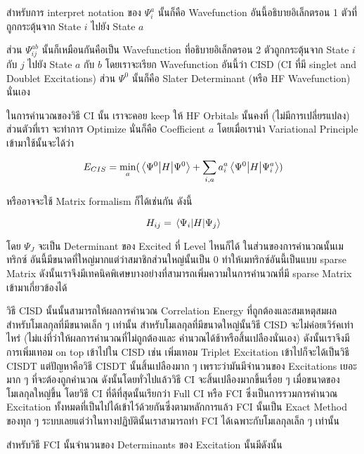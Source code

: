 สำหรับการ interpret notation ของ $\Psi^{a}_{i}$ นั้นก็คือ Wavefunction อันนี้อธิบายอิเล็กตรอน 1
ตัวที่ถูกกระตุ้นจาก State $i$ ไปยัง State $a$

ส่วน $\Psi^{ab}_{ij}$ นั้นก็เหมือนกันคือเป็น Wavefunction ที่อธิบายอิเล็กตรอน 2 ตัวถูกกระตุ้นจาก
State $i$ กับ $j$ ไปยัง State $a$ กับ $b$ โดยเราจะเรียก Wavefunction อันนี้ว่า CISD (CI ที่มี singlet
and Doublet Excitations) ส่วน $\Psi^{0}$ นั้นก็คือ Slater Determinant (หรือ HF Wavefunction)
นั่นเอง

ในการคำนวณของวิธี CI นั้น เราจะคอย keep ให้ HF Orbitals นั้นคงที่ (ไม่มีการเปลี่ยรแปลง) ส่วนตัวที่เรา%
จะทำการ Optimize นั่นก็คือ Coefficient $a$ โดยเมื่อเรานำ Variational Principle เข้ามาใช้นั้นจะได้ว่า

\begin{equation}
    E_{CIS} = \min_{a} ( \mel{\Psi^{0}}{H}{\Psi^{0}}
    + \sum_{i,a} a^{a}_{i} \mel{\Psi^{0}}{H}{\Psi^{a}_{i}} )
\end{equation}

\noindent หรืออาจจะใช้ Matrix formalism ก็ได้เช่นกัน ดังนี้

\begin{equation}
    H_{ij} = \mel{\Psi_{i}}{H}{\Psi_{j}}
\end{equation}

โดย $\Psi_{J}$ จะเป็น Determinant ของ Excited ที่ Level ไหนก็ได้ ในส่วนของการคำนวณนั้นเมทริกซ์%
อันนี้มีขนาดที่ใหญ่มากแต่ว่าสมาชิกส่วนใหญ่นั้นเป็น 0 ทำให้เมทริกซ์อันนี้เป็นแบบ sparse Matrix
ดังนั้นเราจึงมีเทคนิคพิเศษบางอย่างที่สามารถเพิ่มความในการคำนวณที่มี sparse Matrix เข้ามาเกี่ยวข้องได้

วิธี CISD นั้นนั้นสามารถให้ผลการคำนวณ Correlation Energy ที่ถูกต้องและสมเหตุสมผลสำหรับโมเลกุลที่มีขนาดเล็ก ๆ
เท่านั้น สำหรับโมเลกุลที่มีขนาดใหญ่นั้นวิธี CISD จะไม่ค่อยเวิร์คเท่าไหร่ (ไม่แง่ที่ว่าให้ผลการคำนวณที่ไม่ถูกต้องและ%
คำนวณได้ช้าหรือสิ้นเปลืองนั่นเอง) ดังนั้นเราจึงมีการเพิ่มเทอม on top เข้าไปใน CISD เช่น เพิ่มเทอม Triplet
Excitation เข้าไปก็จะได้เป็นวิธี CISDT แต่ปัญหาคือวิธี CISDT นั้นสิ้นเปลืองมาก ๆ เพราะว่ามันมีจำนวนของ
Excitations เยอะมาก ๆ ที่จะต้องถูกคำนวณ ดังนั้นโดยทั่วไปแล้ววิธี CI จะสิ้นเปลืองมากขึ้นเรื่อย ๆ
เมื่อขนาดของโมเลกุลใหญ่ขึ้น โดยวิธี CI ที่ดีที่สุดนั้นเรียกว่า Full CI หรือ FCI ซึ่งเป็นการรวมการคำนวณ
Excitation ทั้งหมดที่เป็นไปได้เข้าไว้ด้วยกันซึ่งตามหลักการแล้ว FCI นั้นเป็น Exact Method ของทุก ๆ
ระบบเลยแต่ว่าในทางปฏิบัตินั้นเราสามารถทำ FCI ได้เฉพาะกับโมเลกุลเล็ก ๆ เท่านั้น

สำหรับวิธี FCI นั้นจำนวนของ Determinants ของ Excitation นั้นมีดังนั้น

